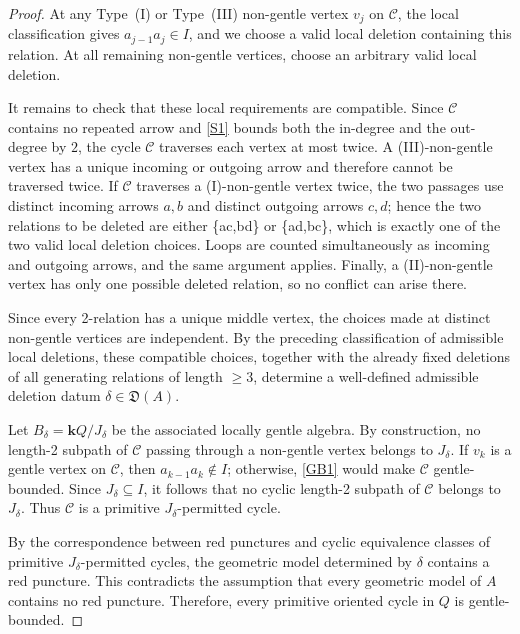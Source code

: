 \documentclass[11pt]{amsart}
\numberwithin{equation}{section}
\theoremstyle{definition}
\begin{document}
\begin{proof}
At any Type~\textup{(I)} or Type~\textup{(III)} non-gentle vertex
\(v_j\) on \(\mathcal{C}\), the local classification gives $a_{j-1}a_j\in I$, and we choose a valid local deletion containing this relation. At all remaining non-gentle vertices, choose an arbitrary valid local deletion.

It remains to check that these local requirements are compatible.
Since \(\mathcal{C}\) contains no repeated arrow and \ref{S1} bounds both the in-degree and the out-degree by
\(2\), the cycle \(\mathcal{C}\) traverses each vertex at most
twice. A \textup{(III)}-non-gentle vertex has a unique
incoming or outgoing arrow and therefore cannot be traversed
twice. If \(\mathcal{C}\) traverses a \textup{(I)}-non-gentle vertex twice, the two passages use distinct incoming
arrows \(a,b\) and distinct outgoing arrows \(c,d\); hence the two
relations to be deleted are either \{ac,bd\} or 
\{ad,bc\}, which is exactly one of the two valid local deletion choices. Loops are counted simultaneously as incoming and outgoing arrows,
and the same argument applies. Finally, a \textup{(II)}-non-gentle vertex has only one possible deleted relation, so no conflict can arise there.

Since every 2-relation has a unique middle vertex, the choices made at distinct non-gentle vertices are independent. By the preceding classification of admissible local deletions, these
compatible choices, together with the already fixed deletions of
all generating relations of length $\ge 3$, determine a well-defined admissible deletion datum $\delta\in\mathfrak{D}(A)$.

Let $B_\delta=\mathbf{k}Q/J_\delta$ be the associated locally gentle algebra. By construction, no length-2 subpath of \(\mathcal{C}\) passing through a non-gentle
vertex belongs to \(J_\delta\). If \(v_k\) is a gentle vertex on
\(\mathcal{C}\), then $a_{k-1}a_k\notin I$; otherwise, \ref{GB1} would make \(\mathcal{C}\)
gentle-bounded. Since \(J_\delta\subseteq I\), it follows that no
cyclic length-2 subpath of \(\mathcal{C}\) belongs to
\(J_\delta\). Thus \(\mathcal{C}\) is a primitive
\(J_\delta\)-permitted cycle.

By the correspondence between red punctures and cyclic
equivalence classes of primitive \(J_\delta\)-permitted cycles,
the geometric model determined by \(\delta\) contains a red
puncture. This contradicts the assumption that every geometric
model of \(A\) contains no red puncture. Therefore, every primitive
oriented cycle in \(Q\) is gentle-bounded.
\end{proof}
\end{document}
